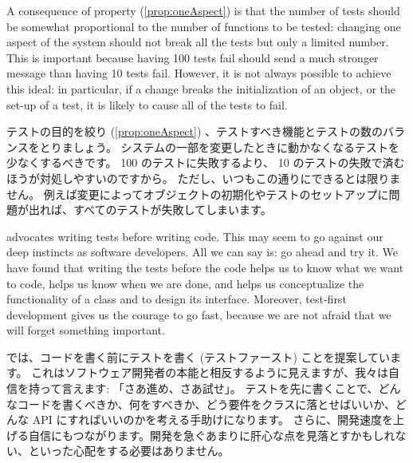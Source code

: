 \documentclass[a4paper,10pt,twoside]{book}
\begin{document}
A consequence of property (\ref{prop:oneAspect}) is that 
the number of tests should be somewhat proportional to the number of
functions to be tested: changing one aspect of the
system should not break all the tests but only a limited
number.  This is important because having 100 tests fail should send a
much stronger message than having 10 tests fail.
However, it is not always possible to achieve this ideal: 
in particular, if a change breaks the initialization of an object, or the
set-up of a test, it is likely to cause all of the tests to fail. 
\fi

テストの目的を絞り (\ref{prop:oneAspect}) 、テストすべき機能とテストの数のバランスをとりましょう。
システムの一部を変更したときに動かなくなるテストを少なくするべきです。
100 のテストに失敗するより、 10 のテストの失敗で済むほうが対処しやすいのですから。
ただし、いつもこの通りにできるとは限りません。
例えば変更によってオブジェクトの初期化やテストのセットアップに問題が出れば、すべてのテストが失敗してしまいます。

 advocates writing tests before writing code.  This may seem to go
against our deep instincts as software developers.  
All we can say is: go ahead and try it.
We have found that writing the tests before the code helps us
to know what we want to code, helps us know when we are done,
and helps us conceptualize the functionality of a class and to
design its interface.
Moreover, test-first development gives us the courage to go fast, because we are not afraid that we will forget something important.  
\fi

 では、コードを書く前にテストを書く (テストファースト) ことを提案しています。
これはソフトウェア開発者の本能と相反するように見えますが、我々は自信を持って言えます: 「さあ進め、さあ試せ」。 
テストを先に書くことで、どんなコードを書くべきか、何をすべきか、どう要件をクラスに落とせばいいか、どんな API にすればいいのかを考える手助けになります。
さらに、開発速度を上げる自信にもつながります。開発を急ぐあまりに肝心な点を見落とすかもしれない、といった心配をする必要はありません。


\end{document}
